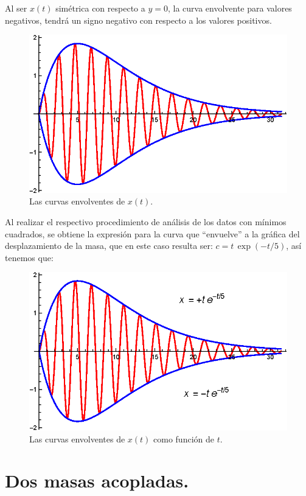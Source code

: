 Al ser $x(t)$ simétrica con respecto a $y = 0$, la curva envolvente para valores negativos, tendrá un signo negativo con respecto a los valores positivos.
\begin{figure}[H]
    \centering
    \includegraphics[scale=1]{Imagenes/Ejemplo_Resonancia_04.eps}
    \caption{Las curvas envolventes de $x(t)$.}
\end{figure}

Al realizar el respectivo procedimiento de análisis de los datos con mínimos cuadrados, se obtiene la expresión para la curva que \enquote{envuelve} a la gráfica del desplazamiento de la masa, que en este caso resulta ser: $c = t \, \exp(-t/5)$, así tenemos que:
\begin{figure}[H]
    \centering
    \includegraphics[scale=1]{Imagenes/Ejemplo_Resonancia_05.eps}
    \caption{Las curvas envolventes de $x(t)$ como función de $t$.}
\end{figure}


\section{Dos masas acopladas.}
